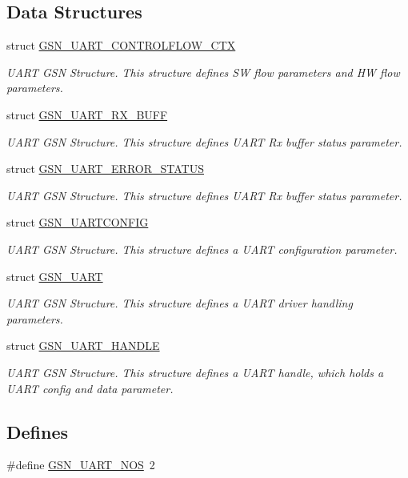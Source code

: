 \subsection*{Data Structures}
\begin{DoxyCompactItemize}
\item 
struct \hyperlink{a00264}{GSN\_\-UART\_\-CONTROLFLOW\_\-CTX}
\begin{DoxyCompactList}\small\item\em UART GSN Structure. This structure defines SW flow parameters and HW flow parameters. \end{DoxyCompactList}\item 
struct \hyperlink{a00267}{GSN\_\-UART\_\-RX\_\-BUFF}
\begin{DoxyCompactList}\small\item\em UART GSN Structure. This structure defines UART Rx buffer status parameter. \end{DoxyCompactList}\item 
struct \hyperlink{a00265}{GSN\_\-UART\_\-ERROR\_\-STATUS}
\begin{DoxyCompactList}\small\item\em UART GSN Structure. This structure defines UART Rx buffer status parameter. \end{DoxyCompactList}\item 
struct \hyperlink{a00268}{GSN\_\-UARTCONFIG}
\begin{DoxyCompactList}\small\item\em UART GSN Structure. This structure defines a UART configuration parameter. \end{DoxyCompactList}\item 
struct \hyperlink{a00263}{GSN\_\-UART}
\begin{DoxyCompactList}\small\item\em UART GSN Structure. This structure defines a UART driver handling parameters. \end{DoxyCompactList}\item 
struct \hyperlink{a00266}{GSN\_\-UART\_\-HANDLE}
\begin{DoxyCompactList}\small\item\em UART GSN Structure. This structure defines a UART handle, which holds a UART config and data parameter. \end{DoxyCompactList}\end{DoxyCompactItemize}
\subsection*{Defines}
\begin{DoxyCompactItemize}
\item 
\#define \hyperlink{a00600_a8d4d184d01326210338840c046d1fb04}{GSN\_\-UART\_\-NOS}~2
\end{DoxyCompactItemize}
